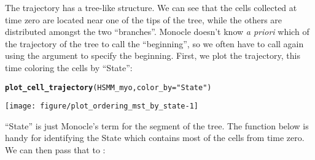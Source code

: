 \documentclass[10pt,oneside]{article}\usepackage[]{graphicx}\usepackage[]{color}
\makeatletter
\def\maxwidth{ %
  \ifdim\Gin@nat@width>\linewidth
    \linewidth
  \else
    \Gin@nat@width
  \fi
}
\newcommand{\hlstr}[1]{\textcolor[rgb]{0.192,0.494,0.8}{#1}}%
\newcommand{\hlstd}[1]{\textcolor[rgb]{0.345,0.345,0.345}{#1}}%
\newcommand{\hlkwc}[1]{\textcolor[rgb]{0.333,0.667,0.333}{#1}}%
\newcommand{\hlkwd}[1]{\textcolor[rgb]{0.737,0.353,0.396}{\textbf{#1}}}%
\newenvironment{kframe}{%
 \def\at@end@of@kframe{}%
 \ifinner\ifhmode%
  \def\at@end@of@kframe{\end{minipage}}%
  \begin{minipage}{\columnwidth}%
 \fi\fi%
 \def\FrameCommand##1{\hskip\@totalleftmargin \hskip-\fboxsep
 \colorbox{shadecolor}{##1}\hskip-\fboxsep
     \hskip-\linewidth \hskip-\@totalleftmargin \hskip\columnwidth}%
 \MakeFramed {\advance\hsize-\width
   \@totalleftmargin\z@ \linewidth\hsize
   \@setminipage}}%
 {\par\unskip\endMakeFramed%
 \at@end@of@kframe}
\newenvironment{knitrout}{}{} %
\makeatother
\begin{document}
 The trajectory has a tree-like structure. We can see that the cells 
 collected at time zero are located near one of the tips of the tree, while the 
 others are distributed amongst the two ``branches''.  Monocle doesn't know
 \emph{a priori} which of the trajectory of the tree to call the ``beginning'',
 so we often have to call  again using the 
  argument to specify the beginning. First, we plot the
 trajectory, this time coloring the cells by ``State'':
 
\begin{knitrout}
\color{fgcolor}\begin{kframe}
\begin{alltt}
\hlkwd{plot_cell_trajectory}\hlstd{(HSMM_myo,} \hlkwc{color_by}\hlstd{=}\hlstr{"State"}\hlstd{)}
\end{alltt}
\end{kframe}

{\centering \texttt{[image: figure/plot\_ordering\_mst\_by\_state-1]} 

}



\end{knitrout}

``State'' is just Monocle's term for the segment of the tree. The function below is handy for identifying the State which contains most of the cells from time zero. We can then pass that to :
\end{document}
